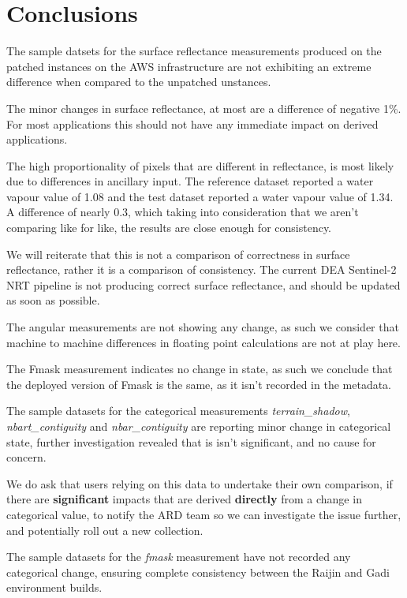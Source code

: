 \documentclass[a4paper]{article}
\begin{document}
  \section{Conclusions}

    \begin{flushleft}
      The sample datsets for the surface reflectance measurements produced on the patched instances on the AWS infrastructure are not exhibiting an extreme difference when compared to the unpatched unstances. \par
      The minor changes in surface reflectance, at most are a difference of negative 1\%. For most applications this should not have any immediate impact on derived applications. \par
      The high proportionality of pixels that are different in reflectance, is most likely due to differences in ancillary input. The reference dataset reported a water vapour value of 1.08 and the test dataset reported a water vapour value of 1.34. A difference of nearly 0.3, which taking into consideration that we aren't comparing like for like, the results are close enough for consistency. \par
      We will reiterate that this is not a comparison of correctness in surface reflectance, rather it is a comparison of consistency. The current DEA Sentinel-2 NRT pipeline is not producing correct surface reflectance, and should be updated as soon as possible.
    \end{flushleft}

    \begin{flushleft}
      The angular measurements are not showing any change, as such we consider that machine to machine differences in floating point calculations are not at play here. \par
      The Fmask measurement indicates no change in state, as such we conclude that the deployed version of Fmask is the same, as it isn't recorded in the metadata. \par
      The sample datasets for the categorical measurements \textit{terrain\_shadow}, \textit{nbart\_contiguity} and \textit{nbar\_contiguity} are reporting minor change in categorical state, further investigation revealed that is isn't significant, and no cause for concern. \par
    \end{flushleft}

    \begin{flushleft}
      We do ask that users relying on this data to undertake their own comparison, if there are \textbf{significant} impacts that are derived \textbf{directly} from a change in categorical value, to notify the ARD team so we can investigate the issue further, and potentially roll out a new collection.\par
      The sample datasets for the \textit{fmask} measurement have not recorded any categorical change, ensuring complete consistency between the Raijin and Gadi environment builds.
    \end{flushleft}
\end{document}
